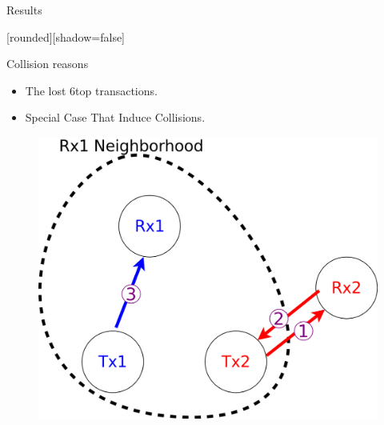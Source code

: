 \begin{withoutheadline}
\begin{frame}{ Results}


[rounded][shadow=false]


\begin{block}{Collision reasons}

    \begin{itemize}
    \item The lost 6top transactions. 
\item<2-> Special Case That Induce Collisions.
    
     
    
    \end{itemize}
    \end{block}

\centering
\begin{figure}[p]

\item<2-> \includegraphics[width=0.4\linewidth]{figures/pro.png}
\end{figure}

\end{frame}
\end{withoutheadline}


